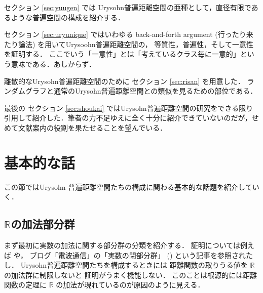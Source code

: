\documentclass[leqno, 12pt]{jsarticle}
\newcommand{\rr}{\mathbb{R}}
\begin{document}
セクション
\ref{sec:yuugen}
では
Urysohn普遍距離空間の亜種として，直径有限であるような普遍空間の構成を紹介する．



セクション
\ref{sec:uryunique}
ではいわゆる
back-and-forth argument (行ったり来たり論法)
を用いてUrysoohn普遍距離空間の，
等質性，普遍性，そして一意性を証明する．
ここでいう「一意性」とは「考えているクラス毎に一意的」という意味である．あしからず．


離散的なUrysohn普遍距離空間のために
セクション
\ref{sec:risan}
を用意した．
ランダムグラフと通常のUrysohn普遍距離空間との類似を見るための部位である．

最後の
セクション
\ref{sec:shoukai}
ではUrysohn普遍距離空間の研究をできる限り引用して紹介した．筆者の力不足ゆえに全く十分に紹介できていないのだが，せめて文献案内の役割を果たせることを望んでいる．



\newpage
\section{基本的な話}\label{sec:preliminaries}
この節ではUrysohn
普遍距離空間たちの構成に関わる基本的な話題を紹介していく．

\subsection{$\rr$の加法部分群}
まず最初に実数の加法に関する部分群の分類を紹介する．
証明については例えば 
\cite{Bourbaki}
や，
ブログ「電波通信」の「実数の閉部分群」
(\cite{denpaGR})
という記事を参照されたし．
Urysohn普遍距離空間たちを構成するときには
距離関数の取りうる値を
$\rr$
の加法群に制限しないと
証明がうまく機能しない．
このことは根源的には距離関数の定理に
$\rr$
の加法が現れているのが原因のように見える．
\end{document}
